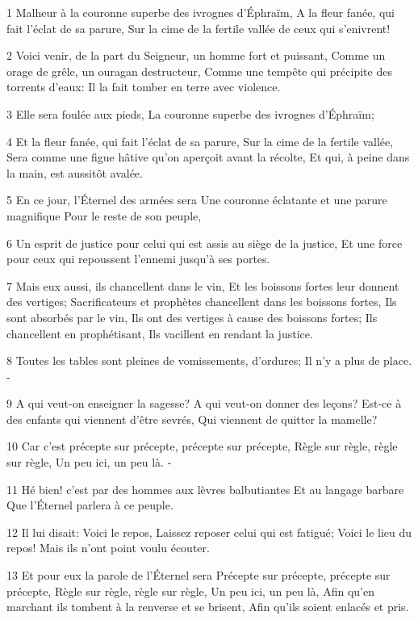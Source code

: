 \par 1 Malheur à la couronne superbe des ivrognes d'Éphraïm, A la fleur fanée, qui fait l'éclat de sa parure, Sur la cime de la fertile vallée de ceux qui s'enivrent!
\par 2 Voici venir, de la part du Seigneur, un homme fort et puissant, Comme un orage de grêle, un ouragan destructeur, Comme une tempête qui précipite des torrents d'eaux: Il la fait tomber en terre avec violence.
\par 3 Elle sera foulée aux pieds, La couronne superbe des ivrognes d'Éphraïm;
\par 4 Et la fleur fanée, qui fait l'éclat de sa parure, Sur la cime de la fertile vallée, Sera comme une figue hâtive qu'on aperçoit avant la récolte, Et qui, à peine dans la main, est aussitôt avalée.
\par 5 En ce jour, l'Éternel des armées sera Une couronne éclatante et une parure magnifique Pour le reste de son peuple,
\par 6 Un esprit de justice pour celui qui est assis au siège de la justice, Et une force pour ceux qui repoussent l'ennemi jusqu'à ses portes.
\par 7 Mais eux aussi, ils chancellent dans le vin, Et les boissons fortes leur donnent des vertiges; Sacrificateurs et prophètes chancellent dans les boissons fortes, Ils sont absorbés par le vin, Ils ont des vertiges à cause des boissons fortes; Ils chancellent en prophétisant, Ils vacillent en rendant la justice.
\par 8 Toutes les tables sont pleines de vomissements, d'ordures; Il n'y a plus de place. -
\par 9 A qui veut-on enseigner la sagesse? A qui veut-on donner des leçons? Est-ce à des enfants qui viennent d'être sevrés, Qui viennent de quitter la mamelle?
\par 10 Car c'est précepte sur précepte, précepte sur précepte, Règle sur règle, règle sur règle, Un peu ici, un peu là. -
\par 11 Hé bien! c'est par des hommes aux lèvres balbutiantes Et au langage barbare Que l'Éternel parlera à ce peuple.
\par 12 Il lui disait: Voici le repos, Laissez reposer celui qui est fatigué; Voici le lieu du repos! Mais ils n'ont point voulu écouter.
\par 13 Et pour eux la parole de l'Éternel sera Précepte sur précepte, précepte sur précepte, Règle sur règle, règle sur règle, Un peu ici, un peu là, Afin qu'en marchant ils tombent à la renverse et se brisent, Afin qu'ils soient enlacés et pris.
